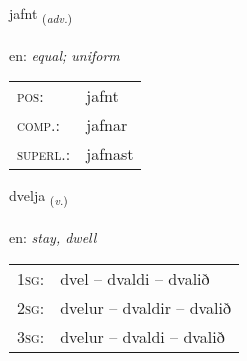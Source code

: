 \documentclass[frontgrid, backgrid]{flacards}\usepackage[]{graphicx}\usepackage[]{color}
\begin{document}
\renewcommand{\flhead}{\vskip5pt \fboxsep=0pt {\small\bfseries\footnotesize Atviksorð | Adverb}}
\renewcommand{\fcfoot}{\vskip5pt \fboxsep=0pt \hspace{2pt}{\small\bfseries\footnotesize 2K}}

\renewcommand{\blhead}{\vskip5pt {\small\bfseries\footnotesize Atviksorð | Adverb }}
\renewcommand{\bcfoot}{\vskip5pt \hspace{2pt}{\small\bfseries\footnotesize 2K}}


{jafnt \small{\textsubscript{(\textit{adv.})}} \\[1ex] %
\textphonetic{[jam̥t]} \\
en: \emph{equal; uniform} \\  [2ex]
\renewcommand*{\arraystretch}{0.8}
\begin{tabular}{ll}
\textsc{pos}: & jafnt \\ 
\textsc{comp.}: & jafnar \\ 
\textsc{superl.}: & jafnast \\
\end{tabular}
}

\renewcommand{\flhead}{\vskip5pt \fboxsep=0pt {\small\bfseries\footnotesize Sagnorð | Verb}}
\renewcommand{\fcfoot}{\vskip5pt \fboxsep=0pt \hspace{2pt}{\small\bfseries\footnotesize 2K}}

\renewcommand{\blhead}{\vskip5pt {\small\bfseries\footnotesize Sagnorð | Verb }}
\renewcommand{\bcfoot}{\vskip5pt \hspace{2pt}{\small\bfseries\footnotesize 2K}}


{dvelja \small{\textsubscript{(\textit{v.})}} \\[1ex] %
\textphonetic{[tvɛlja]} \\
en: \emph{stay, dwell} \\  [2ex]
\renewcommand*{\arraystretch}{0.8}
\begin{tabular}{p{1cm}l}
\textsc{1sg}: & dvel -- dvaldi -- dvalið \\ 
\textsc{2sg}: & dvelur -- dvaldir -- dvalið \\ 
\textsc{3sg}: & dvelur -- dvaldi -- dvalið \\ 
\end{tabular}
}
\end{document}
